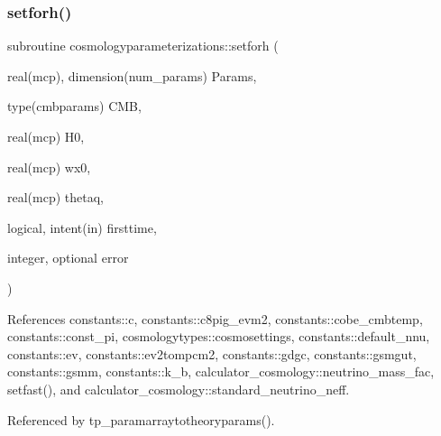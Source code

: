 \subsubsection{\texorpdfstring{setforh()}{setforh()}}
{\footnotesize\ttfamily subroutine cosmologyparameterizations\+::setforh (\begin{DoxyParamCaption}\item[{real(mcp), dimension(num\+\_\+params)}]{Params,  }\item[{type(cmbparams)}]{C\+MB,  }\item[{real(mcp)}]{H0,  }\item[{real(mcp)}]{wx0,  }\item[{real(mcp)}]{thetaq,  }\item[{logical, intent(in)}]{firsttime,  }\item[{integer, optional}]{error }\end{DoxyParamCaption})\hspace{0.3cm}{\ttfamily [private]}}



References constants\+::c, constants\+::c8pig\+\_\+evm2, constants\+::cobe\+\_\+cmbtemp, constants\+::const\+\_\+pi, cosmologytypes\+::cosmosettings, constants\+::default\+\_\+nnu, constants\+::ev, constants\+::ev2tompcm2, constants\+::gdgc, constants\+::gsmgut, constants\+::gsmm, constants\+::k\+\_\+b, calculator\+\_\+cosmology\+::neutrino\+\_\+mass\+\_\+fac, setfast(), and calculator\+\_\+cosmology\+::standard\+\_\+neutrino\+\_\+neff.



Referenced by tp\+\_\+paramarraytotheoryparams().

